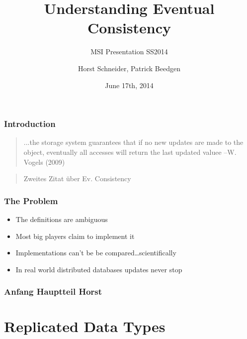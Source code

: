 \documentclass[11pt]{beamer}
\author{Horst Schneider, Patrick Beedgen}
\title{Understanding Eventual Consistency}
\subtitle{MSI Presentation SS2014}
\institute{Hochschule Mannheim}
\date{June 17th, 2014}
\begin{document}
\begin{frame}
\titlepage
\end{frame}

\begin{frame}
\tableofcontents
\end{frame}

\begin{frame}
\frametitle{Introduction}
\begin{quotation}
\glqq ...the 
storage system guarantees that if no 
new updates are made to the object, 
eventually all accesses will return the 
last updated valuee\grqq
\linebreak
--W. Vogels (2009)
\end{quotation}

\begin{quotation}
\glqq Zweites Zitat über Ev. Consistency \grqq
\end{quotation}
\end{frame}

\begin{frame}
\frametitle{The Problem}
\begin{itemize}
  \item The definitions are ambiguous
  \item Most big players claim to implement it
  \item Implementations can't be be compared\ldots scientifically
  \item In real world distributed databases updates never stop
\end{itemize}
\end{frame}

\begin{frame}
\frametitle{Anfang Hauptteil Horst}
\end{frame}

\section{Replicated Data Types}
\end{document}

